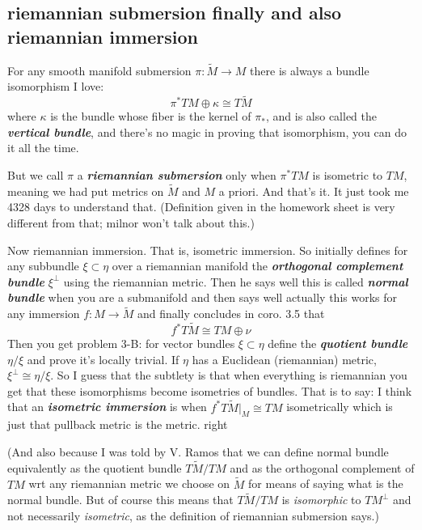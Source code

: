 \subsection{riemannian submersion finally and also riemannian immersion}

For any smooth manifold submersion \(\pi:\widetilde{M}\to M\) there is always a bundle isomorphism I love:
\[\pi^*TM \oplus \kappa\cong T\widetilde{M}\]
where \(\kappa\) is the bundle whose fiber is the kernel of \(\pi_*\), and is also called the \textit{\textbf{vertical bundle}}, and there's no magic in proving that isomorphism, you can do it all the time.

 But we call \(\pi\) a \textit{\textbf{riemannian submersion}} only when \(\pi^*TM\) is isometric to \(TM\), meaning we had put metrics on \(\widetilde{M}\) and \(M\) a priori. And that's it. It just took me 4328 days to understand that. (Definition given in the homework sheet is very different from that; milnor won't talk about this.)

Now riemannian immersion. That is, isometric immersion. So initially \cite{mc} defines for any subbundle \(\xi \subset \eta\) over a riemannian manifold the  \textit{\textbf{orthogonal complement bundle}} \(\xi^\perp\) using the riemannian metric. Then he says well this is called \textit{\textbf{normal bundle}} when you are a submanifold and then says well actually this works for any immersion \(f:M \to \widetilde{M}\) and finally concludes in coro. 3.5 that
\[f^*T\widetilde{M} \cong TM \oplus  \nu\]
Then you get problem 3-B: for vector bundles \(\xi \subset \eta\) define the \textit{\textbf{quotient bundle}} \(\eta/\xi\) and prove it's locally trivial. If \(\eta\) has a Euclidean (riemannian) metric, \(\xi^\perp \cong \eta/\xi\). So I guess that the subtlety is that when everything is riemannian you get that these isomorphisms become isometries of bundles. That is to say: I think that an \textit{\textbf{isometric immersion}} is when \(f^* T \widetilde{M}|_{M}\cong TM\) isometrically which is just that pullback metric is the metric. right

(And also because I was told by V. Ramos that we can define normal bundle equivalently as the quotient bundle \(T\widetilde{M}/TM\) and as the orthogonal complement of \(TM\) wrt any riemannian metric we choose on \(\widetilde{M}\) for means of saying what is the normal bundle. But of course this means that \(T\widetilde{M}/TM\) is \textit{isomorphic} to \(TM^\perp\) and not necessarily \textit{isometric}, as the definition of riemannian submersion says.)

